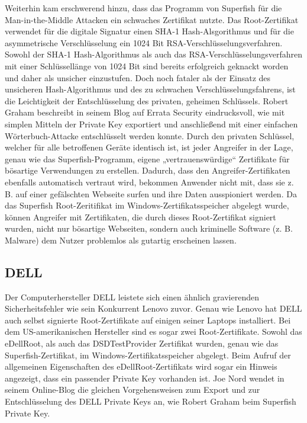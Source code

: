 \noindent %
Weiterhin kam erschwerend hinzu, dass das Programm von Superfish für die Man-in-the-Middle Attacken ein schwaches Zertifikat nutzte. Das Root-Zertifikat verwendet für die digitale Signatur einen SHA-1 Hash-Alsgorithmus und für die asymmetrische Verschlüsselung ein 1024 Bit RSA-Verschlüsselungsverfahren. \cite[vgl.]{lenovo} Sowohl der SHA-1 Hash-Algorithmus als auch das RSA-Verschlüsselungsverfahren mit einer Schlüssellänge von 1024 Bit sind bereits erfolgreich geknackt worden und daher als unsicher einzustufen. \cite[vgl.]{sha-1,rsa}
Doch noch fataler als der Einsatz des unsicheren Hash-Algorithmus und des zu schwachen Verschlüsselungsfahrens, ist die Leichtigkeit der Entschlüsselung des privaten, geheimen Schlüssels. Robert Graham beschreibt in seinem Blog auf Errata Security eindrucksvoll, wie mit simplen Mitteln der Private Key exportiert und anschließend mit einer einfachen Wörterbuch-Attacke entschlüsselt werden konnte. \cite[vgl.]{certificate_ex}
Durch den privaten Schlüssel, welcher für alle betroffenen Geräte identisch ist, ist jeder Angreifer in der Lage, genau wie das Superfish-Programm, eigene „vertrauenswürdige“ Zertifikate für bösartige Verwendungen zu erstellen. Dadurch, dass den Angreifer-Zertifikaten ebenfalls automatisch vertraut wird, bekommen Anwender nicht mit, dass sie z. B. auf einer gefälschten Webseite surfen und ihre Daten ausspioniert werden. Da das Superfish Root-Zeritifikat im Windows-Zertifikatsspeicher abgelegt wurde, können Angreifer mit Zertifikaten, die durch dieses Root-Zertifikat signiert wurden, nicht nur bösartige Webseiten, sondern auch kriminelle Software (z. B. Malware) dem Nutzer problemlos als gutartig erscheinen lassen.

\subsection{DELL}
Der Computerhersteller DELL leistete sich einen ähnlich gravierenden Sicherheitsfehler wie sein Konkurrent Lenovo zuvor. Genau wie Lenovo hat DELL auch selbst signierte Root-Zertifikate auf einigen seiner Laptops installiert. Bei dem US-amerikanischen Hersteller sind es sogar zwei Root-Zertifikate. Sowohl das eDellRoot, als auch das DSDTestProvider Zertifikat wurden, genau wie das Superfish-Zertifikat, im Windows-Zertifikatsspeicher abgelegt. Beim Aufruf der allgemeinen Eigenschaften des eDellRoot-Zertifikats wird sogar ein Hinweis angezeigt, dass ein passender Private Key vorhanden ist. Joe Nord wendet in seinem Online-Blog die gleichen Vorgehensweisen zum Export und zur Entschlüsselung des DELL Private Keys an, wie Robert Graham beim Superfish Private Key. \cite[vgl.]{dell_joe_nord} 

